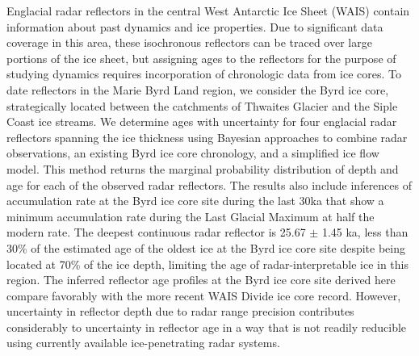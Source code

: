 Englacial radar reflectors in the central West Antarctic Ice Sheet (WAIS) contain information about past dynamics and ice properties. Due to significant data coverage in this area, these isochronous reflectors can be traced over large portions of the ice sheet, but assigning ages to the reflectors for the purpose of studying dynamics requires incorporation of chronologic data from ice cores. To date reflectors in the Marie Byrd Land region, we consider the Byrd ice core, strategically located between the catchments of Thwaites Glacier and the Siple Coast ice streams. We determine ages with uncertainty for four englacial radar reflectors spanning the ice thickness using Bayesian approaches to combine radar observations, an existing Byrd ice core chronology, and a simplified ice flow model. This method returns the marginal probability distribution of depth and age for each of the observed radar reflectors. The results also include inferences of accumulation rate at the Byrd ice core site during the last 30ka that show a minimum accumulation rate during the Last Glacial Maximum at half the modern rate. The deepest continuous radar reflector is 25.67 $\pm$ 1.45 ka, less than 30\% of the estimated age of the oldest ice at the Byrd ice core site despite being located at 70\% of the ice depth, limiting the age of radar-interpretable ice in this region. The inferred reflector age profiles at the Byrd ice core site derived here compare favorably with the more recent WAIS Divide ice core record. However, uncertainty in reflector depth due to radar range precision contributes considerably to uncertainty in reflector age in a way that is not readily reducible using currently available ice-penetrating radar systems.